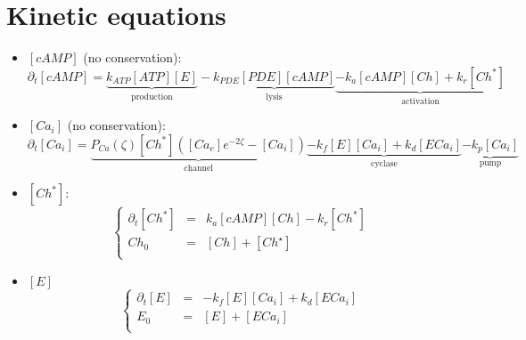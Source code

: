 \documentclass[aps,12pt]{revtex4}
\begin{document}
\section{Kinetic equations}
\begin{itemize}
\item $[cAMP]$ (no conservation):
	\begin{equation}
	\partial_t [cAMP] = \underbrace{k_{ATP} [ATP] [E]}_{\text{production}} 
	- \underbrace{k_{PDE} [PDE] [cAMP]}_{\text{lysis}}
	\underbrace{-k_a [cAMP][Ch] + k_r [Ch^\ast]}_{\text{activation}}
	\end{equation}
	
\item $[Ca_i]$ (no conservation):
	\begin{equation}
		\partial_t [Ca_i] = 
		\underbrace{P_{Ca}(\zeta) [Ch^\ast] ([Ca_e]e^{-2\zeta}-[Ca_i])}_{\text{channel}}
		\underbrace{ - k_f [E] [Ca_i]  + k_d [ECa_i] }_{\text{cyclase}}
		\underbrace{-k_p [Ca_i]}_{\text{pump}}
	\end{equation}
	
\item $[Ch^\ast]$:
	\begin{equation}
	\left\lbrace
	\begin{array}{rcl}
		\partial_t[Ch^\ast] &= &k_a [cAMP][Ch] - k_r [Ch^\ast]\\
	 		Ch_0 & = & [Ch] + [Ch^\star]\\
	\end{array}
	\right.
	\end{equation}
	
\item $[E]$
	\begin{equation}
	\left\lbrace
	\begin{array}{rcl}
		\partial_t [E] & = & - k_f [E] [Ca_i]  + k_d [ECa_i]\\
		E_0 & = & [E] + [ECa_i]\\
	\end{array}
	\right.
	\end{equation}
\end{itemize}
\end{document}
